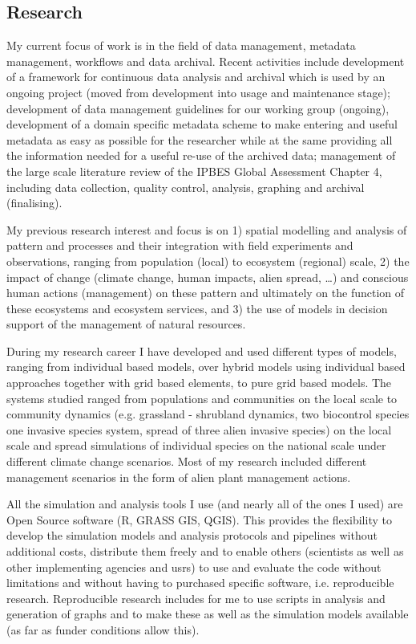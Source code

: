 \documentclass[a4paper]{article}
\begin{document}
\subsection{Research}


My current focus of work is in the field of data management, metadata management, workflows and data archival. Recent activities include development of a framework for continuous data analysis and archival which is used by an ongoing project (moved from development into usage and maintenance stage); development of data management guidelines for our working group (ongoing), development of a domain specific metadata scheme to make entering and useful metadata as easy as possible for the researcher while at the same providing all the information needed for a useful re-use of the archived data; management of the large scale literature review of the IPBES Global Assessment Chapter 4, including data collection, quality control, analysis, graphing and archival (finalising).

My previous research interest and focus is on 1) spatial modelling and analysis of pattern and processes and their integration with field experiments and observations, ranging from population (local) to ecosystem (regional) scale, 2) the impact of change (climate change, human impacts, alien spread, \ldots{}) and conscious human actions (management) on these pattern and ultimately on the function of these ecosystems and ecosystem services, and 3) the use of models in decision support of the management of natural resources.

During my research career I have developed and used different types of models, ranging from individual based models, over hybrid models using individual based approaches together with grid based elements, to pure grid based models. The systems studied ranged from populations and communities on the local scale to community dynamics (e.g. grassland - shrubland dynamics, two biocontrol species one invasive species system, spread of three alien invasive species) on the local scale and spread simulations of individual species on the national scale under different climate change scenarios. Most of my research included different management scenarios in the form of alien plant management actions.

All the simulation and analysis tools I use (and nearly all of the ones I used) are Open Source software (R, GRASS GIS, QGIS). This provides the flexibility to develop the simulation models and analysis protocols and pipelines without additional costs, distribute them freely and to enable others (scientists as well as other implementing agencies and usrs) to use and evaluate the code without limitations and without having to purchased specific software, i.e. reproducible research. Reproducible research includes for me to use scripts in analysis and generation of graphs and to make these as well as the simulation models available (as far as funder conditions allow this).
\end{document}
